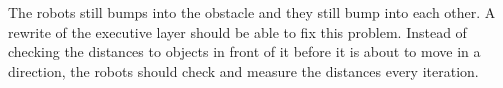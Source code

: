 The robots still bumps into the obstacle and they still bump into each other. A rewrite of the executive layer should be able to fix this problem. Instead of checking the distances to objects in front of it before it is about to move in a direction, the robots should check and measure the distances every iteration.








